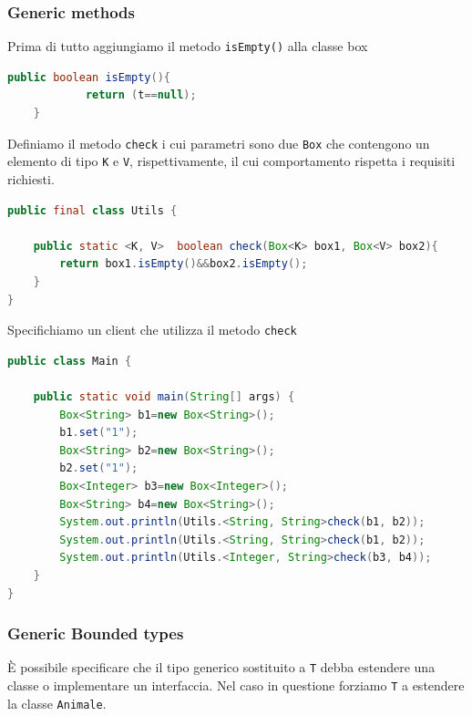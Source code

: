 \documentclass{article}
\begin{document}
\subsubsection{Generic methods}

Prima di tutto aggiungiamo il metodo \texttt{isEmpty()} alla classe box
\begin{lstlisting}[language=Java]
public boolean isEmpty(){
    		return (t==null);
    }
\end{lstlisting}

Definiamo il metodo \texttt{check} i cui parametri sono due \texttt{Box} che contengono un elemento di tipo \texttt{K} e \texttt{V}, rispettivamente, il cui comportamento rispetta i requisiti richiesti.
\begin{lstlisting}[language=Java]
public final class Utils {

	public static <K, V>  boolean check(Box<K> box1, Box<V> box2){
		return box1.isEmpty()&&box2.isEmpty();
	}
}
\end{lstlisting}
Specifichiamo un client che utilizza il metodo \texttt{check}
\begin{lstlisting}[language=Java]
public class Main {

	public static void main(String[] args) {
		Box<String> b1=new Box<String>();
		b1.set("1");
		Box<String> b2=new Box<String>();
		b2.set("1");
		Box<Integer> b3=new Box<Integer>();
		Box<String> b4=new Box<String>();
		System.out.println(Utils.<String, String>check(b1, b2));
		System.out.println(Utils.<String, String>check(b1, b2));
		System.out.println(Utils.<Integer, String>check(b3, b4));
	}
}
\end{lstlisting}

\subsubsection{Generic Bounded types}

\`E possibile specificare che il tipo generico sostituito a \texttt{T} debba estendere una classe o implementare un interfaccia. Nel caso in questione forziamo \texttt{T} a estendere la classe \texttt{Animale}.
\end{document}

